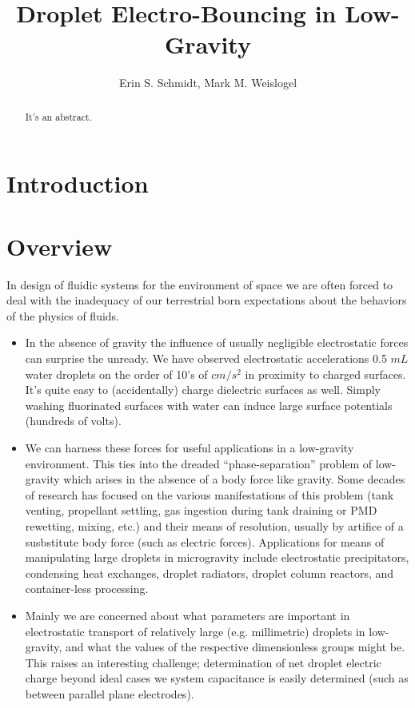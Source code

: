 \documentclass[a4paper, 12pt]{article}
\title{\textsf{\textbf{Droplet Electro-Bouncing in Low-Gravity}}}
\author{Erin S. Schmidt, Mark M. Weislogel}
\date{}
\begin{document}
\maketitle

\begin{abstract}
\noindent
It's an abstract.
\end{abstract}

\section{Introduction}


\section{Overview}
In design of fluidic systems for the environment of space we are often forced to deal with the inadequacy of our terrestrial born expectations about the behaviors of the physics of fluids.   

\begin{itemize}
\item In the absence of gravity the influence of usually negligible electrostatic forces can surprise the unready. We have observed electrostatic accelerations 0.5 $mL$ water droplets on the order of 10's of $cm/s^2$ in proximity to charged surfaces. It's quite easy to (accidentally) charge dielectric surfaces as well. Simply washing fluorinated surfaces with water can induce large surface potentials (hundreds of volts).

\item We can harness these forces for useful applications in a low-gravity environment. This ties into the dreaded ``phase-separation'' problem of low-gravity which arises in the absence of a body force like gravity. Some decades of research has focused on the various manifestations of this problem (tank venting, propellant settling, gas ingestion during tank draining or PMD rewetting, mixing, etc.) and their means of resolution, usually by artifice of a susbstitute body force (such as electric forces). Applications for means of manipulating large droplets in microgravity include electrostatic precipitators, condensing heat exchanges, droplet radiators, droplet column reactors, and container-less processing.

\item Mainly we are concerned about what parameters are important in electrostatic transport of relatively large (e.g. millimetric) droplets in low-gravity, and what the values of the respective dimensionless groups might be. This raises an interesting challenge; determination of net droplet electric charge beyond ideal cases we system capacitance is easily determined (such as between parallel plane electrodes).

\end{itemize}
\end{document}
